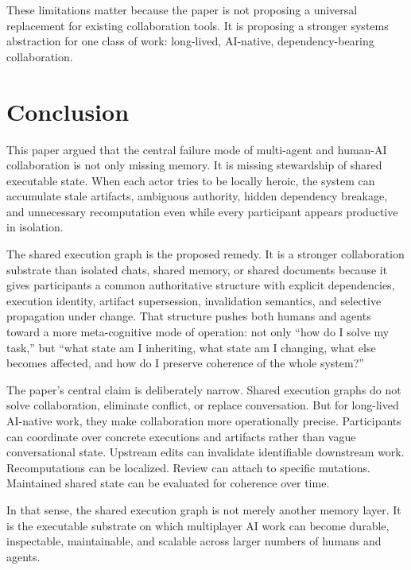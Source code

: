 \documentclass{article}
\begin{document}
These limitations matter because the paper is not proposing a universal replacement for existing collaboration tools. It is proposing a stronger systems abstraction for one class of work: long-lived, AI-native, dependency-bearing collaboration.

\section{Conclusion}

This paper argued that the central failure mode of multi-agent and human-AI collaboration is not only missing memory. It is missing stewardship of shared executable state. When each actor tries to be locally heroic, the system can accumulate stale artifacts, ambiguous authority, hidden dependency breakage, and unnecessary recomputation even while every participant appears productive in isolation.

The shared execution graph is the proposed remedy. It is a stronger collaboration substrate than isolated chats, shared memory, or shared documents because it gives participants a common authoritative structure with explicit dependencies, execution identity, artifact supersession, invalidation semantics, and selective propagation under change. That structure pushes both humans and agents toward a more meta-cognitive mode of operation: not only ``how do I solve my task,'' but ``what state am I inheriting, what state am I changing, what else becomes affected, and how do I preserve coherence of the whole system?''

The paper's central claim is deliberately narrow. Shared execution graphs do not solve collaboration, eliminate conflict, or replace conversation. But for long-lived AI-native work, they make collaboration more operationally precise. Participants can coordinate over concrete executions and artifacts rather than vague conversational state. Upstream edits can invalidate identifiable downstream work. Recomputations can be localized. Review can attach to specific mutations. Maintained shared state can be evaluated for coherence over time.

In that sense, the shared execution graph is not merely another memory layer. It is the executable substrate on which multiplayer AI work can become durable, inspectable, maintainable, and scalable across larger numbers of humans and agents.
\end{document}
